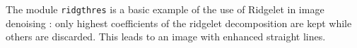 The module {\tt ridgthres} is a basic example of the use of Ridgelet in image
denoising : only highest coefficients of the ridgelet decomposition are kept
while others are discarded. This leads to an image with enhanced straight 
lines.
